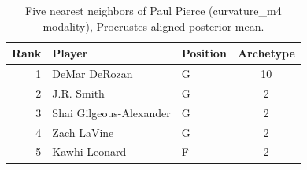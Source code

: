 \begin{table}[htbp]
  \centering\small
  \begin{tabular}{rllc}
    \toprule
    Rank & Player & Position & Archetype \\
    \midrule
    1 & DeMar DeRozan & G & 10 \\
    2 & J.R. Smith & G & 2 \\
    3 & Shai Gilgeous-Alexander & G & 2 \\
    4 & Zach LaVine & G & 2 \\
    5 & Kawhi Leonard & F & 2 \\
    \bottomrule
  \end{tabular}
  \caption{Five nearest neighbors of Paul Pierce (curvature_m4 modality), Procrustes-aligned posterior mean.}
  \label{tab:Paul_Pierce_neighbors_curvature_m4}
\end{table}

